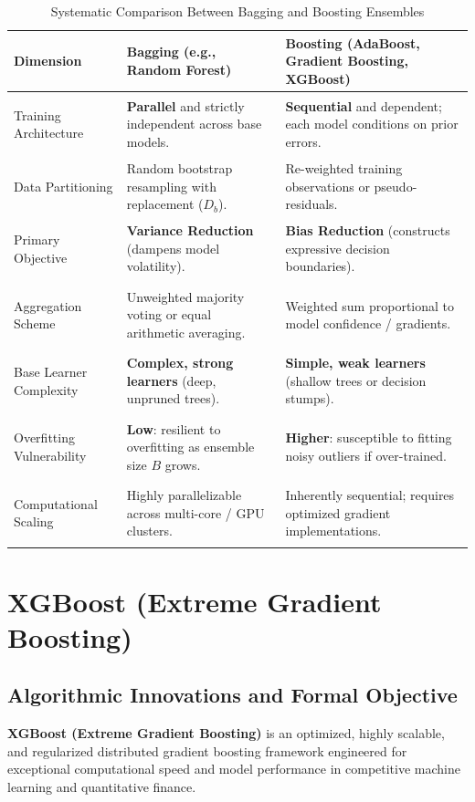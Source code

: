 \begin{table}[htbp]
\centering
\caption{Systematic Comparison Between Bagging and Boosting Ensembles}
\label{tab:bagging_vs_boosting}
\vspace{0.2em}
\renewcommand{\arraystretch}{1.3}
\begin{tabularx}{\textwidth}{>{\bfseries\raggedright\arraybackslash}p{3.0cm}XX}
\toprule
Dimension & Bagging (e.g., Random Forest) & Boosting (AdaBoost, Gradient Boosting, XGBoost) \\
\midrule
Training Architecture & \textbf{Parallel} and strictly independent across base models. & \textbf{Sequential} and dependent; each model conditions on prior errors. \\
Data Partitioning & Random bootstrap resampling with replacement ($D_b$). & Re-weighted training observations or pseudo-residuals. \\
Primary Objective & \textbf{Variance Reduction} (dampens model volatility). & \textbf{Bias Reduction} (constructs expressive decision boundaries). \\
Aggregation Scheme & Unweighted majority voting or equal arithmetic averaging. & Weighted sum proportional to model confidence / gradients. \\
Base Learner Complexity & \textbf{Complex, strong learners} (deep, unpruned trees). & \textbf{Simple, weak learners} (shallow trees or decision stumps). \\
Overfitting Vulnerability & \textbf{Low}: resilient to overfitting as ensemble size $B$ grows. & \textbf{Higher}: susceptible to fitting noisy outliers if over-trained. \\
Computational Scaling & Highly parallelizable across multi-core / GPU clusters. & Inherently sequential; requires optimized gradient implementations. \\
\bottomrule
\end{tabularx}
\end{table}

\section{XGBoost (Extreme Gradient Boosting)}

\subsection{Algorithmic Innovations and Formal Objective}
\textbf{XGBoost (Extreme Gradient Boosting)} is an optimized, highly scalable, and regularized distributed gradient boosting framework engineered for exceptional computational speed and model performance in competitive machine learning and quantitative finance.

